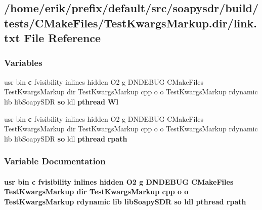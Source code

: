 \subsection{/home/erik/prefix/default/src/soapysdr/build/tests/\+C\+Make\+Files/\+Test\+Kwargs\+Markup.dir/link.txt File Reference}
\label{soapysdr_2build_2tests_2CMakeFiles_2TestKwargsMarkup_8dir_2link_8txt}
\subsubsection*{Variables}
\begin{DoxyCompactItemize}
\item 
usr bin {\bf c} fvisibility inlines hidden O2 g D\+N\+D\+E\+B\+UG C\+Make\+Files Test\+Kwargs\+Markup dir Test\+Kwargs\+Markup cpp o o Test\+Kwargs\+Markup rdynamic lib lib\+Soapy\+S\+DR {\bf so} ldl {\bf pthread} {\bf Wl}
\item 
usr bin {\bf c} fvisibility inlines hidden O2 g D\+N\+D\+E\+B\+UG C\+Make\+Files Test\+Kwargs\+Markup dir Test\+Kwargs\+Markup cpp o o Test\+Kwargs\+Markup rdynamic lib lib\+Soapy\+S\+DR {\bf so} ldl {\bf pthread} {\bf rpath}
\end{DoxyCompactItemize}


\subsubsection{Variable Documentation}
\paragraph[{rpath}]{\setlength{\rightskip}{0pt plus 5cm}usr bin {\bf c} fvisibility inlines hidden O2 g D\+N\+D\+E\+B\+UG C\+Make\+Files Test\+Kwargs\+Markup dir Test\+Kwargs\+Markup cpp o o Test\+Kwargs\+Markup rdynamic lib lib\+Soapy\+S\+DR {\bf so} ldl {\bf pthread} rpath}\label{soapysdr_2build_2tests_2CMakeFiles_2TestKwargsMarkup_8dir_2link_8txt_a0d049dcda153b236cbeb9fd87d342575}


